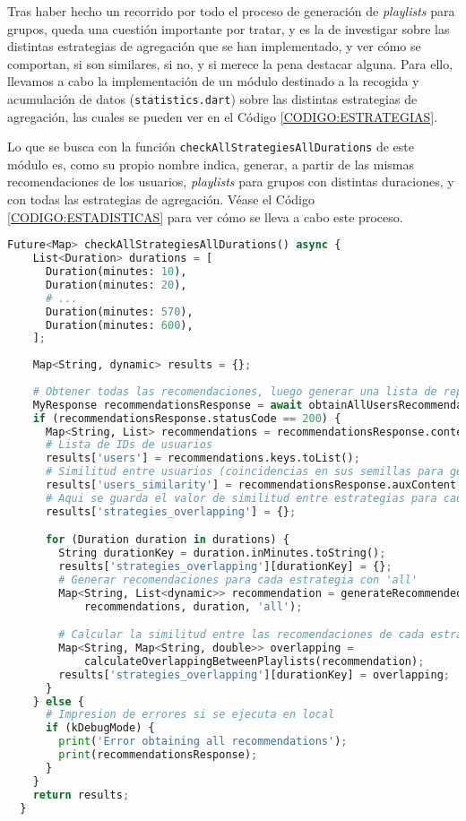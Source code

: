 Tras haber hecho un recorrido por todo el proceso de generación de \textit{playlists} para grupos, queda una cuestión importante por tratar, y es
la de investigar sobre las distintas estrategias de agregación que se han implementado, y ver cómo se comportan, si son similares, si no, y si merece la pena 
destacar alguna. Para ello, llevamos a cabo la implementación de un módulo destinado a la recogida y acumulación de datos (\texttt{statistics.dart}) sobre 
las distintas estrategias de agregación, las cuales se pueden ver en el Código \ref{CODIGO:ESTRATEGIAS}.

Lo que se busca con la función \texttt{checkAllStrategiesAllDurations}  de este módulo es, como su propio nombre indica, generar, a partir de las 
mismas recomendaciones de los usuarios, \textit{playlists} para grupos con distintas duraciones, y con todas las estrategias de agregación.
Véase el Código \ref{CODIGO:ESTADISTICAS} para ver cómo se lleva a cabo este proceso.

\begin{lstlisting}[language=python, caption=Generación de estadísticas, label=CODIGO:ESTADISTICAS]
  Future<Map> checkAllStrategiesAllDurations() async {
    List<Duration> durations = [
      Duration(minutes: 10),
      Duration(minutes: 20),
      # ...
      Duration(minutes: 570),
      Duration(minutes: 600),
    ];
  
    Map<String, dynamic> results = {};
  
    # Obtener todas las recomendaciones, luego generar una lista de reproduccion para cada estrategia y duracion
    MyResponse recommendationsResponse = await obtainAllUsersRecommendations();
    if (recommendationsResponse.statusCode == 200) {
      Map<String, List> recommendations = recommendationsResponse.content;
      # Lista de IDs de usuarios
      results['users'] = recommendations.keys.toList(); 
      # Similitud entre usuarios (coincidencias en sus semillas para generar recomendaciones)
      results['users_similarity'] = recommendationsResponse.auxContent;
      # Aqui se guarda el valor de similitud entre estrategias para cada duracion 
      results['strategies_overlapping'] = {};

      for (Duration duration in durations) {
        String durationKey = duration.inMinutes.toString();
        results['strategies_overlapping'][durationKey] = {};
        # Generar recomendaciones para cada estrategia con 'all'
        Map<String, List<dynamic>> recommendation = generateRecommendedPlaylist(
            recommendations, duration, 'all');

        # Calcular la similitud entre las recomendaciones de cada estrategia
        Map<String, Map<String, double>> overlapping =
            calculateOverlappingBetweenPlaylists(recommendation);
        results['strategies_overlapping'][durationKey] = overlapping;
      }
    } else {
      # Impresion de errores si se ejecuta en local
      if (kDebugMode) {
        print('Error obtaining all recommendations');
        print(recommendationsResponse);
      }
    }
    return results;
  }
\end{lstlisting}

